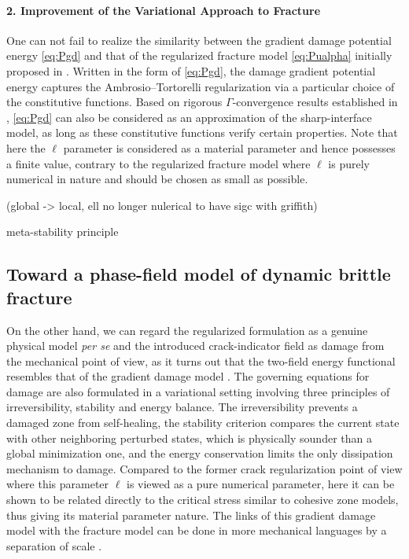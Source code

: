 \paragraph{2. Improvement of the Variational Approach to Fracture} One can not fail to realize the similarity between the gradient damage potential energy \eqref{eq:Pgd} and that of the regularized fracture model \eqref{eq:Pualpha} initially proposed in \cite{BourdinFrancfortMarigo:2000}. Written in the form of \eqref{eq:Pgd}, the damage gradient potential energy captures the Ambrosio--Tortorelli regularization via a particular choice of the constitutive functions. Based on rigorous $\Gamma$-convergence results established in \cite{Braides:2002}, \eqref{eq:Pgd} can also be considered as an approximation of the sharp-interface model, as long as these constitutive functions verify certain properties. Note that here the $\ell$ parameter is considered as a material parameter and hence possesses a finite value, contrary to the regularized fracture model where $\ell$ is purely numerical in nature and should be chosen as small as possible.

(global -> local, ell no longer nulerical to have sigc with griffith)

meta-stability principle \cite{BenallalMarigo:2007}\cite{Nguyen:2000}

\cite{PhamMarigo:2010,PhamMarigo:2010-1}

\subsection{Toward a phase-field model of dynamic brittle fracture}
On the other hand, we can regard the regularized formulation as a genuine physical model \emph{per se} and the introduced crack-indicator field as damage from the mechanical point of view, as it turns out that the two-field energy functional resembles that of the gradient damage model \cite{PhamMarigo:2010,PhamMarigo:2010-1,PhamAmorMarigoMaurini:2011,SicsicMarigoMaurini:2013}. The governing equations for damage are also formulated in a variational setting involving three principles of irreversibility, stability and energy balance. The irreversibility prevents a damaged zone from self-healing, the stability criterion compares the current state with other neighboring perturbed states, which is physically sounder than a global minimization one, and the energy conservation limits the only dissipation mechanism to damage. Compared to the former crack regularization point of view where this parameter $\ell$ is viewed as a pure numerical parameter, here it can be shown to be related directly to the critical stress similar to cohesive zone models, thus giving its material parameter nature. The links of this gradient damage model with the fracture model can be done in more mechanical languages by a separation of scale \cite{SicsicMarigo:2013,LorentzCuvilliezKazymyrenko:2011,LorentzCuvilliezKazymyrenko:2012}. 

